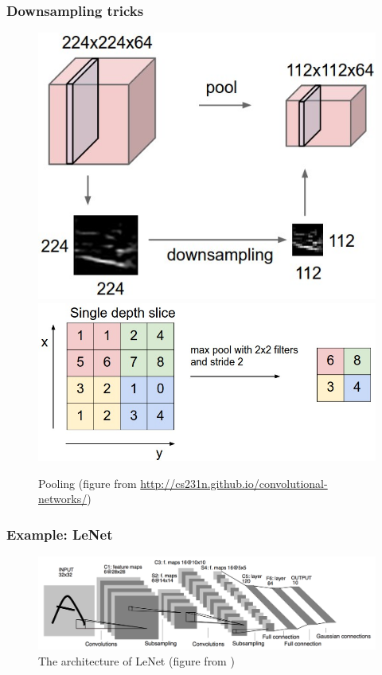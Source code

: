 \documentclass{beamer}
\begin{document}
\begin{frame}

\frametitle{Downsampling tricks}

\begin{figure}
\includegraphics[scale=0.2]{pool}
\includegraphics[scale=0.2]{maxpool}
\caption{Pooling (figure from \url{http://cs231n.github.io/convolutional-networks/})}
\end{figure}
\end{frame}

\begin{frame}

\frametitle{Example: LeNet}

\begin{figure}
\includegraphics[scale=0.1]{lenet}
\caption{The architecture of LeNet (figure from \cite{lecun1998gradient})}
\end{figure}

\end{frame}
\end{document}
